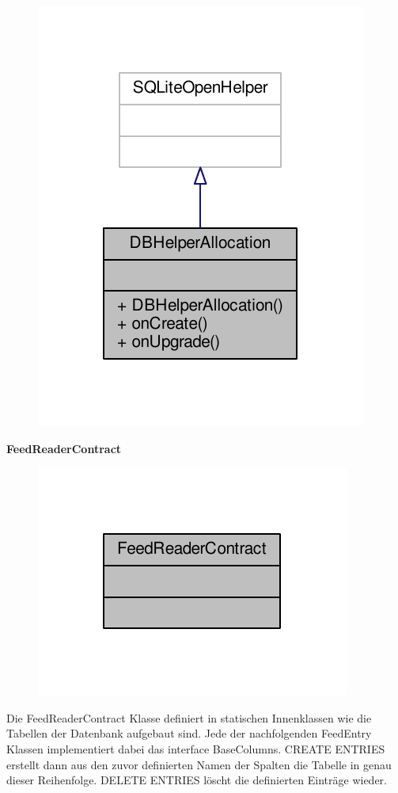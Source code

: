 \begin{figure}[H]
	\includegraphics[scale = 1]{res/umlClasses/d_b_helper_allocation__coll__graph.pdf}
	\centering
\end{figure}



\textbf{FeedReaderContract}
\begin{figure}[H]
	\includegraphics[scale = 1]{res/umlClasses/feed_reader_contract__coll__graph.pdf}
	\centering
\end{figure}
Die FeedReaderContract Klasse definiert in statischen Innenklassen wie die Tabellen der Datenbank aufgebaut sind. Jede der nachfolgenden FeedEntry Klassen implementiert dabei das interface BaseColumns.
CREATE ENTRIES erstellt dann aus den zuvor definierten Namen der Spalten die Tabelle in genau dieser Reihenfolge.
DELETE ENTRIES löscht die definierten Einträge wieder.

